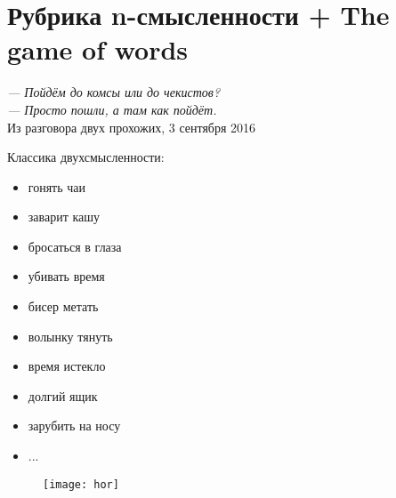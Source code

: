 \section{Рубрика n-смысленности + The game of words}

\begin{displayquote}
    \begin{flushright}
        \emph{--- Пойдём до комсы или до чекистов?\\
        --- Просто пошли, а там как пойдёт.}\\
        Из разговора двух прохожих, 3 сентября 2016
    \end{flushright}
\end{displayquote}

Классика двухсмысленности:
\begin{itemize}
    \item гонять чаи
    \item заварит кашу
    \item бросаться в глаза
    \item убивать время
    \item бисер метать
    \item волынку тянуть
    \item время истекло
    \item долгий ящик
    \item зарубить на носу
    \item ...
\end{itemize}

\begin{figure}[ht!]
    \centering
    \texttt{[image: hor]}
\end{figure}

\begin{flushright}
\end{flushright}

